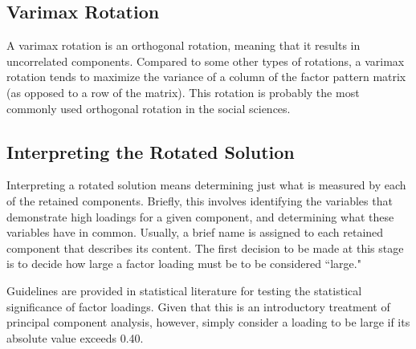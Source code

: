 \documentclass[a4paper,12pt]{article}
\begin{document}
\subsection{Varimax Rotation}
A varimax rotation is an orthogonal rotation, meaning that
it results in uncorrelated components. Compared to some other types of rotations, a varimax
rotation tends to maximize the variance of a column of the factor pattern matrix (as opposed to a
row of the matrix). This rotation is probably the most commonly used orthogonal rotation in the
social sciences.

\subsection{Interpreting the Rotated Solution}

Interpreting a rotated solution means determining just what is measured by each of the retained
components. Briefly, this involves identifying the variables that demonstrate high loadings for a
given component, and determining what these variables have in common. Usually, a brief name
is assigned to each retained component that describes its content.
The first decision to be made at this stage is to decide how large a factor loading must be to be
considered ``large."

Guidelines are provided in statistical literature for testing the statistical significance of factor loadings. Given that this is an introductory treatment of principal component analysis, however, simply consider a loading
to be large if its absolute value exceeds 0.40.
\end{document}

